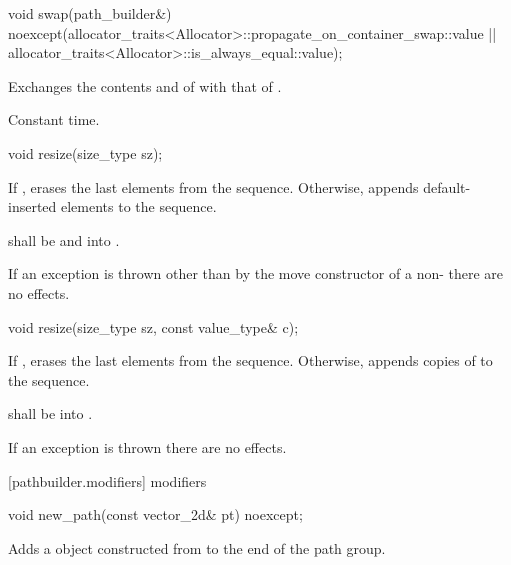 %
\begin{itemdecl}
void swap(path_builder&)
  noexcept(allocator_traits<Allocator>::propagate_on_container_swap::value ||
  allocator_traits<Allocator>::is_always_equal::value);
\end{itemdecl}
\begin{itemdescr}
\pnum
\effects
Exchanges the contents and
of
with that of .

\pnum
\complexity
Constant time.
\end{itemdescr}

%
\begin{itemdecl}
void resize(size_type sz);
\end{itemdecl}
\begin{itemdescr}
\pnum
\effects
If , erases the last  elements
from the sequence. Otherwise, appends  default-inserted 
elements to the sequence.

\pnum
\requires
{} shall be
 and  into .

\pnum
\remarks
If an exception is thrown other than by the move constructor of a 
non-
 there are no effects.
\end{itemdescr}

%
\begin{itemdecl}
void resize(size_type sz, const value_type& c);
\end{itemdecl}
\begin{itemdescr}
\pnum
\effects
If , erases the last  elements
from the sequence. Otherwise,
appends  copies of  to the sequence.

\pnum
\requires
{} shall be  into .

\pnum
\remarks
If an exception is thrown there are no effects.
\end{itemdescr}

 [pathbuilder.modifiers] { modifiers}%

%
\begin{itemdecl}
void new_path(const vector_2d& pt) noexcept;
\end{itemdecl}
\begin{itemdescr}
\pnum
\effects
Adds a  object constructed from  to the end of the path group.
\end{itemdescr}

